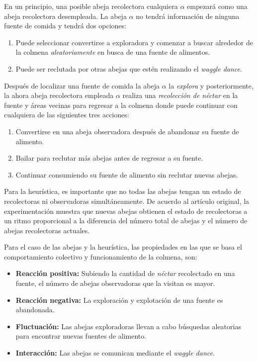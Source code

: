 En un principio, una posible abeja recolectora cualquiera $\alpha$ empezará
como una abeja recolectora desempleada. La abeja $\alpha$ no tendrá información
de ninguna fuente de comida y tendrá dos opciones:

\begin{enumerate}
\item Puede seleccionar convertirse a exploradora y comenzar a buscar alrededor de la
colmena \textit{aleatoriamente} en busca de una fuente de alimentos.
\item Puede ser reclutada por otras abejas que estén realizando el \textit{waggle dance}.
\end{enumerate}

Después de localizar una fuente de comida la abeja $\alpha$ la \textit{explora}
y posteriormente, la ahora abeja recolectora empleada $\alpha$ realiza una
\textit{recolección de néctar} en la fuente y áreas vecinas para regresar a la
colmena donde puede continuar con cualquiera de las siguientes tres acciones:

\begin{enumerate}
\item Convertirse en una abeja observadora después de abandonar su fuente de alimento.

\item Bailar para reclutar más abejas antes de regresar a su fuente.

\item Continuar consumiendo su fuente de alimento sin reclutar nuevas abejas.
\end{enumerate}

Para la heurística, es importante que no todas las abejas tengan un estado de
recolectoras ni observadoras simultáneamente. De acuerdo al artículo original, la
experimentación muestra que nuevas abejas obtienen el estado de recolectoras
a un ritmo proporcional a la diferencia del número total de abejas y el número
de abejas recolectoras actuales.

Para el caso de las abejas y la heurística, las propiedades en las que se basa
el comportamiento colectivo y funcionamiento de la colmena, son:

\begin{itemize}
\item \textbf{Reacción positiva:} Subiendo la cantidad de \textit{néctar}
recolectado en una fuente, el número de abejas observadoras que la visitan es
mayor.

\item \textbf{Reacción negativa:} La exploración y explotación de una fuente es
abandonada.

\item \textbf{Fluctuación:} Las abejas exploradoras llevan a cabo búsquedas aleatorias
para encontrar nuevas fuentes de alimento.

\item \textbf{Interacción:} Las abejas se comunican mediante el \textit{waggle dance}.

\end{itemize}

